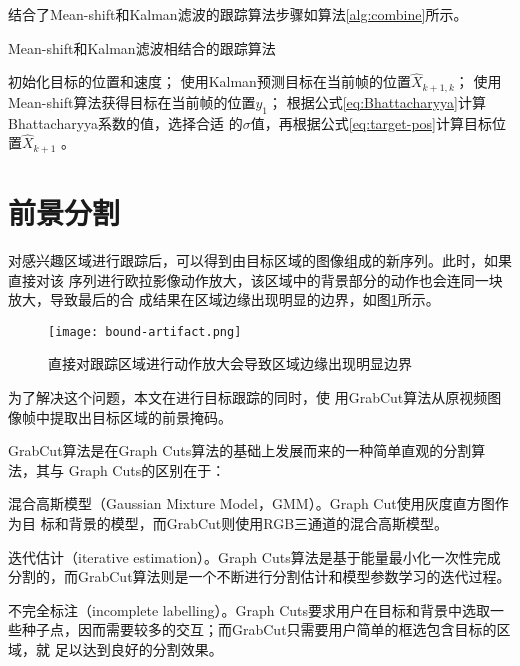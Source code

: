结合了Mean-shift和Kalman滤波的跟踪算法步骤如算法\ref{alg:combine}所示。

\begin{algorithm}
  \caption{Mean-shift和Kalman滤波相结合的跟踪算法}
  \label{alg:combine}
  \begin{algorithmic}[1]
    \STATE 初始化目标的位置和速度；
    \STATE 使用Kalman预测目标在当前帧的位置$\hat{X}_{k+1,k}$；
    \STATE 使用Mean-shift算法获得目标在当前帧的位置$y_1$；
    \STATE 根据公式\ref{eq:Bhattacharyya}计算Bhattacharyya系数的值，选择合适
    的$\sigma$值，再根据公式\ref{eq:target-pos}计算目标位置$\hat{X}_{k+1}$ 。
  \end{algorithmic}
\end{algorithm}

\section{前景分割}
\label{sec:grabcut}

对感兴趣区域进行跟踪后，可以得到由目标区域的图像组成的新序列。此时，如果直接对该
序列进行欧拉影像动作放大，该区域中的背景部分的动作也会连同一块放大，导致最后的合
成结果在区域边缘出现明显的边界，如图\ref{fig:bound-artifact}所示。

\begin{figure}[htbp]
  \centering
  \texttt{[image: bound-artifact.png]}
  \caption{直接对跟踪区域进行动作放大会导致区域边缘出现明显边界}
  \label{fig:bound-artifact}
\end{figure}

为了解决这个问题，本文在进行目标跟踪的同时，使
用GrabCut算法从原视频图像帧中提取出目标区域的前景掩码。

GrabCut算法是在Graph Cuts算法的基础上发展而来的一种简单直观的分割算法，其与
Graph Cuts的区别在于：

\begin{compactenum}
\item 混合高斯模型（Gaussian Mixture Model，GMM）。Graph Cut使用灰度直方图作为目
  标和背景的模型，而GrabCut则使用RGB三通道的混合高斯模型。
\item 迭代估计（iterative estimation）。Graph Cuts算法是基于能量最小化一次性完成
  分割的，而GrabCut算法则是一个不断进行分割估计和模型参数学习的迭代过程。
\item 不完全标注（incomplete labelling）。Graph Cuts要求用户在目标和背景中选取一
  些种子点，因而需要较多的交互；而GrabCut只需要用户简单的框选包含目标的区域，就
  足以达到良好的分割效果。
\end{compactenum}

